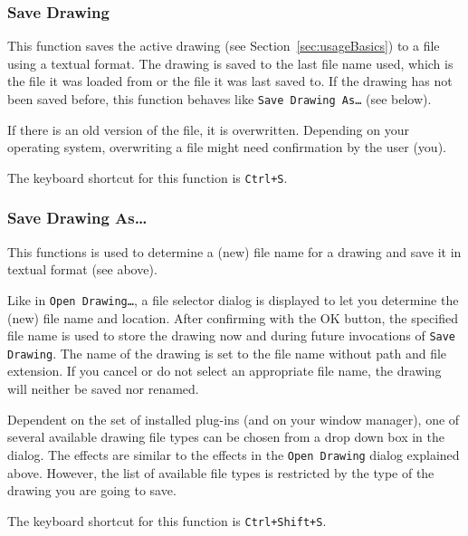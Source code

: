 \subsubsection{Save Drawing}

This function saves the active drawing (see Section~\ref{sec:usageBasics})
to a file using a textual format.
The drawing is saved to the last file name used, which is the file
it was loaded from or the file it was last saved to.
If the drawing has not been saved before, this function behaves
like \texttt{Save Drawing As\dots{}} (see below).

If there is an old version of the file, it is overwritten.
Depending on your operating system, overwriting a file might
need confirmation by the user (you).

The keyboard shortcut for this function is \texttt{Ctrl+S}.

\subsubsection{Save Drawing As\dots}

This functions is used to determine a (new) file name for a
drawing and save it in textual format (see above).

Like in \texttt{Open Drawing\dots{}}, a file selector dialog is displayed to let
you determine the (new) file name and location.
After confirming with the OK button, the specified file name
is used to store the drawing now and during future invocations
of \texttt{Save Drawing}. The name of the drawing is
set to the file name without path and file extension.
If you cancel or do not select an appropriate file name,
the drawing will neither be saved nor renamed.

Dependent on the set of installed plug-ins (and on your window
manager), one of several available drawing file types can be
chosen from a drop down box in the dialog.
The effects are similar to the effects in the \texttt{Open
Drawing} dialog explained above.
However, the list of available file types is restricted by the
type of the drawing you are going to save.

The keyboard shortcut for this function is \texttt{Ctrl+Shift+S}.

%

